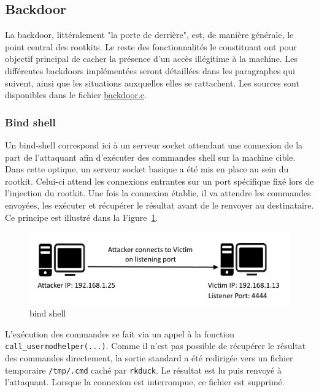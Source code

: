 \documentclass[12pt]{article}
\begin{document}
    \subsection{Backdoor}

        La backdoor, littéralement "la porte de derrière", est, de manière générale, le point central des rootkits. Le reste des fonctionnalités le constituant ont pour objectif principal de cacher la présence d'un accès illégitime à la machine. Les différentes backdoors implémentées seront détaillées dans les paragraphes qui suivent, ainsi que les situations auxquelles elles se rattachent. Les sources sont disponibles dans le fichier \href{https://github.com/QuokkaLight/rkduck/blob/master/rkduck/backdoor.c}{backdoor.c}.
    
        \subsubsection{Bind shell}
            
            Un bind-shell correspond ici à un serveur socket attendant une connexion de la part de l'attaquant afin d'exécuter des commandes shell sur la machine cible. Dans cette optique, un serveur socket basique a été mis en place au sein du rootkit. Celui-ci attend les connexions entrantes sur un port spécifique fixé lors de l'injection du rootkit. Une fois la connexion établie, il va attendre les commandes envoyées, les exécuter et récupérer le résultat avant de le renvoyer au destinataire. Ce principe est illustré dans la Figure~\ref{figure:2}.
            
\begin{figure}[H] 
\begin{center}
\includegraphics{./img/bind-shell.png}

\caption[dsfsdf]{bind shell}
\label{figure:2}
\end{center}
\end{figure}
            
            L'exécution des commandes se fait via un appel à la fonction \texttt{ call\_usermodhelper(...)}. Comme il n'est pas possible de récupérer le résultat des commandes directement, la sortie standard a été redirigée vers un fichier temporaire \texttt{/tmp/.cmd} caché par \texttt{rkduck}. Le résultat est lu puis renvoyé à l'attaquant. Lorsque la connexion est interrompue, ce fichier est supprimé.
            
\end{document}

